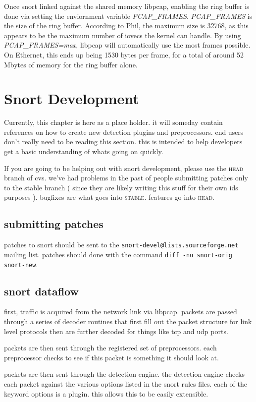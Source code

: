\documentclass[english]{report}
\begin{document}
Once snort linked against the shared memory libpcap, enabling the ring buffer is done via setting the enviornment variable \emph{PCAP\_FRAMES}.  \emph{PCAP\_FRAMES} is the size of the ring buffer.  According to Phil, the maximum size is 32768, as this appears to be the maximum number of iovecs the kernel can handle.  By using \emph{PCAP\_FRAMES=max}, libpcap will automatically use the most frames possible.  On Ethernet, this ends up being 1530 bytes per frame, for a total of around 52 Mbytes of memory for the ring buffer alone.

\newpage
\chapter{Snort Development}

Currently, this chapter is here as a place holder. it will someday
contain references on how to create new detection plugins and
preprocessors.  end users don't really need to be reading this
section. this is intended to help developers get a basic understanding
of whats going on quickly.

If you are going to be helping out with snort development, please
use the \textsc{head} branch of cvs. we've had problems in the past
of people submitting patches only to the stable branch ( since they
are likely writing this stuff for their own ids purposes ). bugfixes
are what goes into \textsc{stable}. features go into \textsc{head}.

\section{submitting patches}
patches to snort should be sent to the \verb!snort-devel@lists.sourceforge.net!
mailing list.  patches should done with the command \verb!diff -nu snort-orig snort-new!.

\section{snort dataflow}
first, traffic is acquired from the network link via libpcap. packets
are passed through a series of decoder routines that first fill out
the packet structure for link level protocols then are further decoded
for things like tcp and udp ports.

packets are then sent through the registered set of preprocessors.
each preprocessor checks to see if this packet is something it should
look at.

packets are then sent through the detection engine. the detection
engine checks each packet against the various options listed in the
snort rules files. each of the keyword options is a plugin. this allows
this to be easily extensible.
\end{document}
